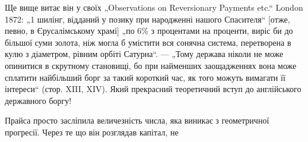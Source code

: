 Ще вище витає він у своїх „Observations on Reversionary Payments
etc.“ London 1872: „1 шилінг, відданий у позику при народженні
нашого Спасителя“ [отже, певно, в Єрусалімському храмі]
„по 6\% з процентами на проценти, виріс би до більшої суми
золота, ніж могла б умістити вся сонячна система, перетворена
в кулю з діаметром, рівним орбіті Сатурна“. — „Тому держава
ніколи не може опинитися в скрутному становищі, бо при найменших
заощадженнях вона може сплатити найбільший борг за
такий короткий час, як того можуть вимагати її інтереси“ (стор.
XIII, XIV). Який прекрасний теоретичний вступ до англійського
державного боргу!

Прайса просто засліпила величезність числа, яка виникає з геометричної
прогресії. Через те що він розглядав капітал, не
\parbreak{}  %
